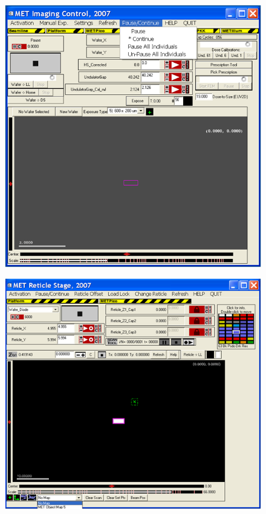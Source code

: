 \documentclass[10pt,letter,twoside]{report}
\begin{document}
\begin{figure}[ht]
{			\includegraphics[scale=0.5]{img/met3-imaging.png}}
			\centerline{\includegraphics[scale=0.5]{img/met3-reticle.png}
}
\end{figure}
\end{document}
